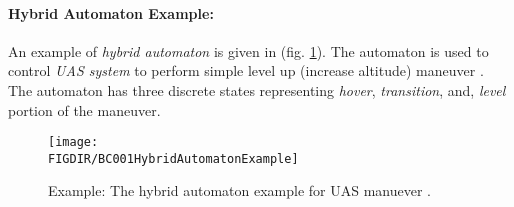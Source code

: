\paragraph{Hybrid Automaton Example:} An example of \emph{hybrid automaton} is given in (fig. \ref{fig:hybridAtomatonExample}). The automaton is used to control \emph{UAS system} to perform simple level up (increase altitude) maneuver \cite{casau2011uav}. The automaton has three discrete states representing \emph{hover}, \emph{transition}, and, \emph{level} portion of the maneuver.

\begin{figure}[H]
    \centering
    \texttt{[image: \\FIGDIR/BC001HybridAutomatonExample]} 
    \caption{Example: The hybrid automaton example for UAS manuever \cite{casau2011uav}.}
    \label{fig:hybridAtomatonExample}
\end{figure}
